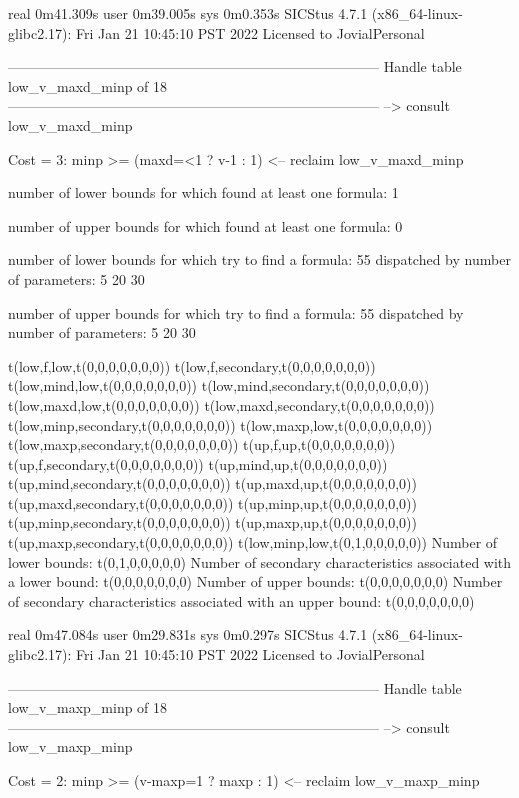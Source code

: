 real	0m41.309s
user	0m39.005s
sys	0m0.353s
SICStus 4.7.1 (x86_64-linux-glibc2.17): Fri Jan 21 10:45:10 PST 2022
Licensed to JovialPersonal


--------------------------------------------------------------------------------
Handle table low_v_maxd_minp of 18
--------------------------------------------------------------------------------
--> consult low_v_maxd_minp

Cost =  3:  minp >= (maxd=<1 ? v-1 : 1)
<-- reclaim low_v_maxd_minp

number of lower bounds for which found at least one formula: 1

number of upper bounds for which found at least one formula: 0

number of lower bounds for which try to find a formula: 55
dispatched by number of parameters: 5  20  30

number of upper bounds for which try to find a formula: 55
dispatched by number of parameters: 5  20  30

t(low,f,low,t(0,0,0,0,0,0,0))
t(low,f,secondary,t(0,0,0,0,0,0,0))
t(low,mind,low,t(0,0,0,0,0,0,0))
t(low,mind,secondary,t(0,0,0,0,0,0,0))
t(low,maxd,low,t(0,0,0,0,0,0,0))
t(low,maxd,secondary,t(0,0,0,0,0,0,0))
t(low,minp,secondary,t(0,0,0,0,0,0,0))
t(low,maxp,low,t(0,0,0,0,0,0,0))
t(low,maxp,secondary,t(0,0,0,0,0,0,0))
t(up,f,up,t(0,0,0,0,0,0,0))
t(up,f,secondary,t(0,0,0,0,0,0,0))
t(up,mind,up,t(0,0,0,0,0,0,0))
t(up,mind,secondary,t(0,0,0,0,0,0,0))
t(up,maxd,up,t(0,0,0,0,0,0,0))
t(up,maxd,secondary,t(0,0,0,0,0,0,0))
t(up,minp,up,t(0,0,0,0,0,0,0))
t(up,minp,secondary,t(0,0,0,0,0,0,0))
t(up,maxp,up,t(0,0,0,0,0,0,0))
t(up,maxp,secondary,t(0,0,0,0,0,0,0))
t(low,minp,low,t(0,1,0,0,0,0,0))
Number of lower bounds:                                             t(0,1,0,0,0,0,0)
Number of secondary characteristics associated with a lower bound:  t(0,0,0,0,0,0,0)
Number of upper bounds:                                             t(0,0,0,0,0,0,0)
Number of secondary characteristics associated with an upper bound: t(0,0,0,0,0,0,0)

real	0m47.084s
user	0m29.831s
sys	0m0.297s
SICStus 4.7.1 (x86_64-linux-glibc2.17): Fri Jan 21 10:45:10 PST 2022
Licensed to JovialPersonal


--------------------------------------------------------------------------------
Handle table low_v_maxp_minp of 18
--------------------------------------------------------------------------------
--> consult low_v_maxp_minp

Cost =  2:  minp >= (v-maxp=1 ? maxp : 1)
<-- reclaim low_v_maxp_minp

